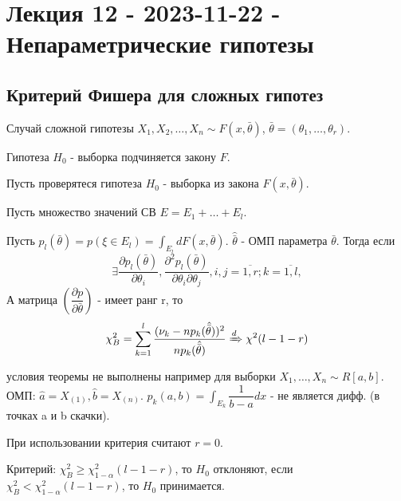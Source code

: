 \section{Лекция 12 - 2023-11-22 - Непараметрические гипотезы}

\subsection{Критерий Фишера для сложных гипотез}

\begin{ex}
  Случай сложной гипотезы
  $X_1, X_2, \dots, X_n \sim F(x, \bar \theta)$, $\bar\theta = (\theta_1, \dots, \theta_r)$.

  Гипотеза $H_0$ - выборка подчиняется закону $F$.
\end{ex}

\begin{theorem}
  Пусть проверятеся гипотеза $H_0$ - выборка из закона $F(x, \bar\theta)$.
  
  Пусть множество значений СВ $E = E_1 + \dots + E_l$.
  
  Пусть $p_l (\bar\theta) = p(\xi \in E_l) = \int_{E_l} dF(x, \bar\theta)$. 
  $\hat{\bar\theta}$ - ОМП параметра $\bar\theta$.
  Тогда если
  \[
    \exists \dfrac{\partial p_l(\bar\theta)}{\partial \theta_i}, \dfrac{\partial^2 p_l(\bar\theta)}{\partial \theta_i \partial \theta_j}, i, j = \overline{1, r}; k=\overline{1, l},
  \]
  А матрица $\left(\dfrac{\partial p}{\partial \bar\theta}\right)$ - имеет ранг r, то
  \[
    \chi^2_B = \sum_{k=1}^l \dfrac{(\nu_k - np_k(\hat{\bar\theta}))^2}{np_k(\hat{\bar\theta})} \xRightarrow[]{d} \chi^2 (l-1-r)
  \]
\end{theorem}


\begin{remark}
  условия теоремы не выполнены например для выборки $X_1, \dots, X_n \sim R[a, b]$.
  ОМП: $\hat a = X_{(1)}, \hat b = X_{(n)}$. $p_k (a, b) = \int_{E_k} \dfrac{1}{b-a} dx$ - не является дифф. (в точках a и b скачки).
\end{remark}

При использовании критерия считают $r = 0$.

Критерий: $\chi^2_B \geqslant \chi^2_{1-\alpha} (l-1-r)$, то $H_0$ отклоняют, если $\chi^2_B < \chi^2_{1-\alpha} (l-1-r)$, то $H_0$ принимается.

